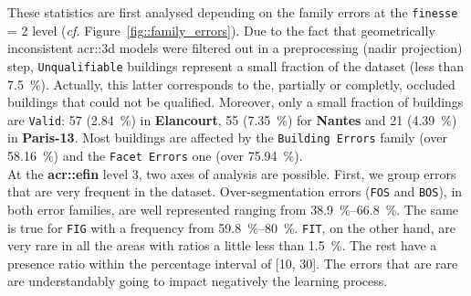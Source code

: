         These statistics are first analysed depending on the family errors at the \texttt{finesse} = 2 level (\textit{cf.} Figure~\ref{fig::family_errors}).
        Due to the fact that geometrically inconsistent \gls{acr::3d} models were filtered out in a preprocessing (nadir projection) step, \texttt{Unqualifiable} buildings represent a small fraction of the dataset (less than \SI{7.5}{\percent}).
        Actually, this latter corresponds to the, partially or completly, occluded buildings that could not be qualified.
        Moreover, only a small fraction of buildings are \texttt{Valid}:
        57 (\SI{2.84}{\percent}) in \textbf{Elancourt}, 55 (\SI{7.35}{\percent}) for \textbf{Nantes} and 21 (\SI{4.39}{\percent}) in \textbf{Paris-13}.
        Most buildings are affected by the \texttt{Building Errors} family (over \SI{58.16}{\percent}) and the \texttt{Facet Errors} one (over \SI{75.94}{\percent}).\\

        At the \textbf{\gls{acr::efin}} level 3, two axes of analysis are possible.
        First, we group errors that are very frequent in the dataset.
        Over-segmentation errors (\texttt{FOS} and \texttt{BOS}), in both error families, are well represented ranging from \SIrange{38.9}{66.8}{\percent}.
        The same is true for \texttt{FIG} with a frequency from \SIrange{59.8}{80}{\percent}.
        \texttt{FIT}, on the other hand, are very rare in all the areas with ratios a little less than \SI{1.5}{\percent}.
        The rest have a presence ratio within the percentage interval of [10, 30].
        The errors that are rare are understandably going to impact negatively the learning process.\\
        
